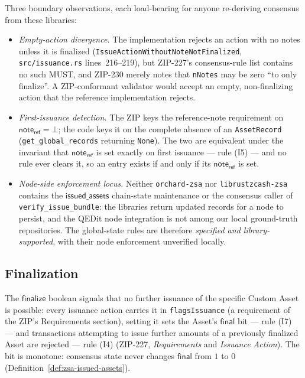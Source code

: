 \documentclass[11pt,a4paper]{article}
\theoremstyle{definition}
\begin{document}
Three boundary observations, each load-bearing for anyone re-deriving
consensus from these libraries:
\begin{itemize}
\item \emph{Empty-action divergence.} The implementation rejects an
  action with no notes unless it is finalized
  (\texttt{IssueActionWithoutNoteNotFinalized},
  \texttt{src/issuance.rs} lines~216--219), but ZIP-227's consensus-rule
  list contains no such MUST, and ZIP-230 merely notes that
  \texttt{nNotes} may be zero ``to only finalize''. A ZIP-conformant
  validator would accept an empty, non-finalizing action that the
  reference implementation rejects.
\item \emph{First-issuance detection.} The ZIP keys the reference-note
  requirement on $\mathsf{note_{ref}} = \bot$; the code keys it on the
  complete absence of an \texttt{AssetRecord}
  (\texttt{get\_global\_records} returning \texttt{None}). The two are
  equivalent under the invariant that $\mathsf{note_{ref}}$ is set
  exactly on first issuance --- rule (I5) --- and no rule ever clears
  it, so an entry exists if and only if its $\mathsf{note_{ref}}$ is
  set.
\item \emph{Node-side enforcement locus.} Neither
  \texttt{orchard-zsa} nor \texttt{librustzcash-zsa} contains the
  $\mathsf{issued\_assets}$ chain-state maintenance or the consensus
  caller of \texttt{verify\_issue\_bundle}: the libraries return updated
  records for a node to persist, and the QEDit node integration is not
  among our local ground-truth repositories. The global-state rules are
  therefore \emph{specified and library-supported}, with their node
  enforcement unverified locally.
\end{itemize}

\subsection{Finalization}\label{sec:zsa-issuance-final}

The $\mathsf{finalize}$ boolean signals that no further issuance of the
specific Custom Asset is possible: every issuance action carries it in
\texttt{flagsIssuance} (a requirement of the ZIP's Requirements section),
setting it sets the Asset's $\mathsf{final}$ bit --- rule (I7) --- and
transactions attempting to issue further amounts of a previously
finalized Asset are rejected --- rule (I4) (ZIP-227,
\emph{Requirements} and \emph{Issuance Action}). The bit is monotone:
consensus state never changes $\mathsf{final}$ from $1$ to $0$
(Definition~\ref{def:zsa-issued-assets}).
\end{document}
